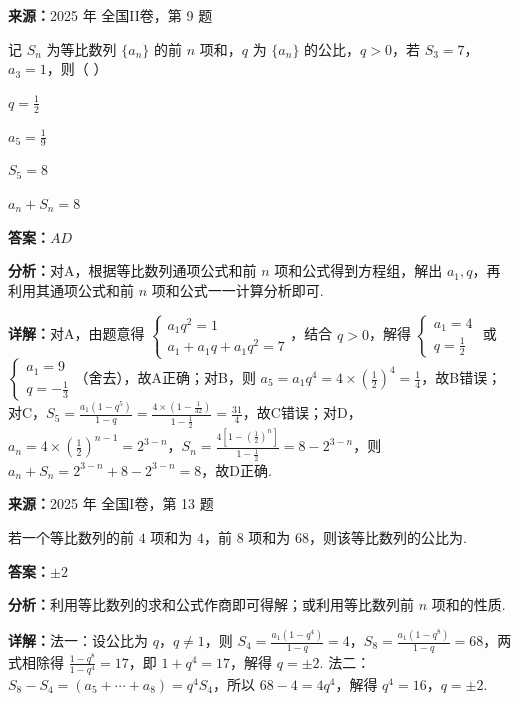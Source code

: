 \begin{question}[points=6]
\textbf{来源：}2025 年 全国II卷，第 9 题\par
记 $S_n$ 为等比数列 $\{a_n\}$ 的前 $n$ 项和，$q$ 为 $\{a_n\}$ 的公比，$q>0$，若 $S_3=7$，$a_3=1$，则（ ）
\begin{choices}
  \item $q=\frac{1}{2}$
  \item $a_5=\frac{1}{9}$
  \item $S_5=8$
  \item $a_n+S_n=8$
\end{choices}
\begin{solution}
\textbf{答案：}$AD$

\textbf{分析：}对A，根据等比数列通项公式和前 $n$ 项和公式得到方程组，解出 $a_1,q$，再利用其通项公式和前 $n$ 项和公式一一计算分析即可.

\textbf{详解：}对A，由题意得 $\begin{cases}a_1q^2=1\\a_1+a_1q+a_1q^2=7\end{cases}$，结合 $q>0$，解得 $\begin{cases}a_1=4\\q=\frac{1}{2}\end{cases}$ 或 $\begin{cases}a_1=9\\q=-\frac{1}{3}\end{cases}$（舍去），故A正确；对B，则 $a_5=a_1q^4=4\times\left(\frac{1}{2}\right)^4=\frac{1}{4}$，故B错误；对C，$S_5=\frac{a_1(1-q^5)}{1-q}=\frac{4\times\left(1-\frac{1}{32}\right)}{1-\frac{1}{2}}=\frac{31}{4}$，故C错误；对D，$a_n=4\times\left(\frac{1}{2}\right)^{n-1}=2^{3-n}$，$S_n=\frac{4\left[1-\left(\frac{1}{2}\right)^n\right]}{1-\frac{1}{2}}=8-2^{3-n}$，则 $a_n+S_n=2^{3-n}+8-2^{3-n}=8$，故D正确.
\end{solution}
\end{question}

\begin{question}[points=5]
\textbf{来源：}2025 年 全国I卷，第 13 题\par
若一个等比数列的前 $4$ 项和为 $4$，前 $8$ 项和为 $68$，则该等比数列的公比为.
\fillin[{$\pm 2$}]
\begin{solution}
\textbf{答案：}$\pm 2$

\textbf{分析：}利用等比数列的求和公式作商即可得解；或利用等比数列前 $n$ 项和的性质.

\textbf{详解：}法一：设公比为 $q$，$q \neq 1$，则 $S_4 = \frac{a_1(1-q^4)}{1-q} = 4$，$S_8 = \frac{a_1(1-q^8)}{1-q} = 68$，两式相除得 $\frac{1-q^8}{1-q^4}=17$，即 $1+q^4=17$，解得 $q = \pm 2$. 法二：$S_8 - S_4 = (a_5+\cdots+a_8) = q^4 S_4$，所以 $68-4 = 4q^4$，解得 $q^4=16$，$q = \pm 2$.
\end{solution}
\end{question}

